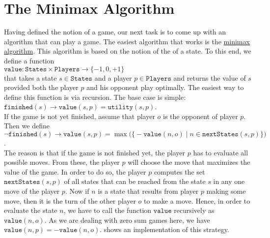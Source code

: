 \section{The Minimax Algorithm}
Having defined the notion of a game, our next task is to come up with an algorithm that can play a game.  The
easiest algorithm that works is the \href{https://en.wikipedia.org/wiki/Minimax}{minimax algorithm}.  This
algorithm is based on the notion of the  of a state.  To this end, we define a function
\\[0.2cm]
\hspace*{1.3cm}
$\mathtt{value}: \mathtt{States} \times \mathtt{Players} \rightarrow \{-1, 0, +1\}$
\\[0.2cm]
that takes a state $s \in \mathtt{States}$ and a player $p \in \mathtt{Players}$ and returns the value of $s$ provided both the player $p$ and his
opponent play optimally.  The easiest way to define this function is via recursion.  The base case is simple:
\\[0.2cm]
\hspace*{1.3cm}
$\mathtt{finished}(s) \rightarrow \mathtt{value}(s, p) = \mathtt{utility}(s, p)$.
\\[0.2cm]
If the game is not yet finished, assume that player $o$ is the opponent of player $p$.  Then we define
\\[0.2cm]
\hspace*{1.3cm}
$\neg \mathtt{finished}(s) \rightarrow 
 \mathtt{value}(s, p) = \max\bigl(\bigl\{
                     -\mathtt{value}(n, o) \mid n \in \mathtt{nextStates}(s, p)
                     \bigr\}\bigr)
$.
\\[0.2cm]
The reason is that if the game is not finished yet, the player $p$ has to evaluate all possible moves.  
From these, the player $p$ will choose the move that maximizes the value of the game.  In order to do so, the
player $p$ computes the set 
$\mathtt{nextStates}(s, p)$ of all states that can be reached from the state $s$ in any one move of the player $p$.
Now if $n$ is a state that results from player $p$ making some move, then it is the turn of the other player
$o$ to make a move.  Hence, in order to evaluate the state $n$, we have to call the function $\mathtt{value}$
recursively as $\mathtt{value}(n,o)$.  As we are dealing with zero sum games here, we have $\mathtt{value}(n, p) = -\mathtt{value}(n, o)$.
 shows an implementation of this strategy.


